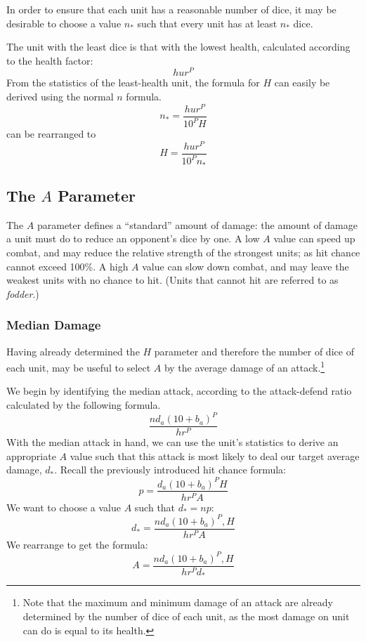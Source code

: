 In order to ensure that each unit has a reasonable number of dice,
it may be desirable to choose a value $n_*$
such that every unit has at least $n_*$ dice.

The unit with the least dice is that with the lowest health,
calculated according to the health factor:
\[
    h u r^P
\]
From the statistics of the least-health unit, the formula for $H$
can easily be derived using the normal $n$ formula.
\[
    n_* =
        \frac
            {h u r^P}
            {10^P H}
\]
can be rearranged to
\[
    H =
        \frac
            {h u r^P}
            {10^P n_*}
\]


\subsection{The $A$ Parameter}

The $A$ parameter defines a ``standard'' amount of damage:
the amount of damage a unit must do to reduce an opponent's dice by one.
A low $A$ value can speed up combat,
and may reduce the relative strength of the strongest units;
as hit chance cannot exceed 100\%.
A high $A$ value can slow down combat,
and may leave the weakest units with no chance to hit.
(Units that cannot hit are referred to as \emph{fodder}.)

\subsubsection{Median Damage}

Having already determined the $H$ parameter and
therefore the number of dice of each unit,
may be useful to select $A$ by the average damage of an attack.\footnote{
    Note that the maximum and minimum damage of an attack
    are already determined by the number of dice of each unit,
    as the most damage on unit can do is equal to its health.
}

We begin by identifying the median attack,
according to the attack-defend ratio calculated by the following formula.
\[
    \frac
        {n d_a (10 + b_a)^P}
        {h r^P}
\]
With the median attack in hand,
we can use the unit's statistics to derive an appropriate $A$ value
such that this attack is most likely to deal our target average damage, $d_*$.
Recall the previously introduced hit chance formula:
\[
    p = \frac
        {d_a (10 + b_a)^P H}
        {h r^P A}
\]
We want to choose a value $A$ such that $d_* = n p$:
\[
    d_* = \frac
        {n d_a (10 + b_a)^P, H}
        {h r^P A}
\]
We rearrange to get the formula:
\[
    A = \frac
        {n d_a (10 + b_a)^P, H}
        {h r^P d_*}
\]

